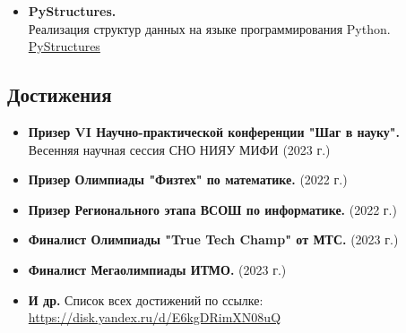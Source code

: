 \documentclass[14pt]{extarticle}
\begin{document}
\begin{minipage}{0.6\textwidth}
\begin{itemize}
            \item \textbf{PyStructures.} \\
                  Реализация структур данных на языке программирования Python. \\
                  \href{https://github.com/MichaelKolesnikov/PyStructures}{PyStructures}
      \end{itemize}
      \subsection*{Достижения}
      \begin{itemize}
            \item \textbf{Призер VI Научно-практической конференции "Шаг в науку".} \\
                  Весенняя научная сессия СНО НИЯУ МИФИ (2023 г.)

            \item \textbf{Призер Олимпиады "Физтех" по математике.} (2022 г.)

            \item \textbf{Призер Регионального этапа ВСОШ по информатике.} (2022 г.)

            \item \textbf{Финалист Олимпиады "True Tech Champ" от МТС.} (2023 г.)

            \item \textbf{Финалист Мегаолимпиады ИТМО.} (2023 г.)

            \item \textbf{И др.} Список всех достижений по ссылке: \\
                  \href{https://disk.yandex.ru/d/E6kgDRimXN08uQ}{https://disk.yandex.ru/d/E6kgDRimXN08uQ}
      \end{itemize}
\end{minipage}
\end{document}
